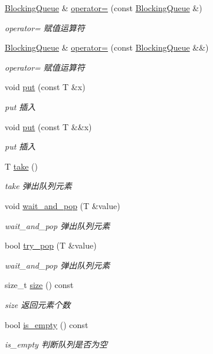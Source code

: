 \begin{DoxyCompactItemize}
\hyperlink{classBlockingQueue}{Blocking\+Queue} \& \hyperlink{classBlockingQueue_aaee07bb9044a01b4cb0af75748795325}{operator=} (const \hyperlink{classBlockingQueue}{Blocking\+Queue} \&)
\begin{DoxyCompactList}\small\item\em operator= 赋值运算符 \end{DoxyCompactList}\item 
\hyperlink{classBlockingQueue}{Blocking\+Queue} \& \hyperlink{classBlockingQueue_abbe4440d6ed06d175925bba1f3c02312}{operator=} (const \hyperlink{classBlockingQueue}{Blocking\+Queue} \&\&)
\begin{DoxyCompactList}\small\item\em operator= 赋值运算符 \end{DoxyCompactList}\item 
void \hyperlink{classBlockingQueue_a1c824f8d644951d25bed9825794ddeae}{put} (const T \&x)
\begin{DoxyCompactList}\small\item\em put 插入 \end{DoxyCompactList}\item 
void \hyperlink{classBlockingQueue_acedd6887a4af752440fb2dcd04292fa3}{put} (const T \&\&x)
\begin{DoxyCompactList}\small\item\em put 插入 \end{DoxyCompactList}\item 
T \hyperlink{classBlockingQueue_aac788baea510940fc40961a285bacc5f}{take} ()
\begin{DoxyCompactList}\small\item\em take 弹出队列元素 \end{DoxyCompactList}\item 
void \hyperlink{classBlockingQueue_a8efc43c38666a38402c39f772da63fcf}{wait\+\_\+and\+\_\+pop} (T \&value)
\begin{DoxyCompactList}\small\item\em wait\+\_\+and\+\_\+pop 弹出队列元素 \end{DoxyCompactList}\item 
bool \hyperlink{classBlockingQueue_a47a2d7726112b4e2d7b3f65a4e84aa06}{try\+\_\+pop} (T \&value)
\begin{DoxyCompactList}\small\item\em wait\+\_\+and\+\_\+pop 弹出队列元素 \end{DoxyCompactList}\item 
size\+\_\+t \hyperlink{classBlockingQueue_a733361d5721c6ba64af3e129921c43b0}{size} () const
\begin{DoxyCompactList}\small\item\em size 返回元素个数 \end{DoxyCompactList}\item 
bool \hyperlink{classBlockingQueue_a06f9211f5225bb6413f403e8d14ca7ce}{is\+\_\+empty} () const
\begin{DoxyCompactList}\small\item\em is\+\_\+empty 判断队列是否为空 \end{DoxyCompactList}\end{DoxyCompactItemize}



